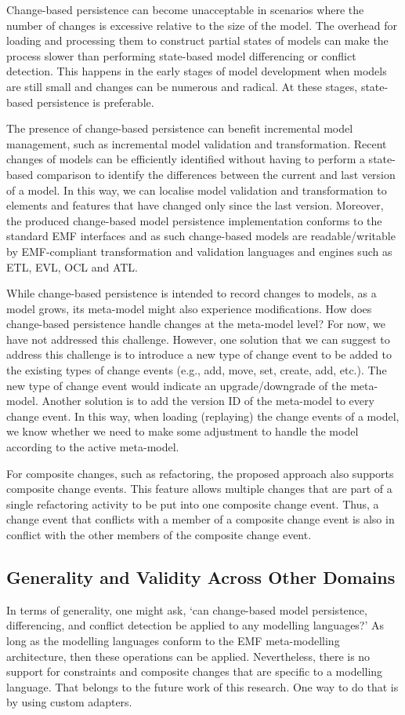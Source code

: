 Change-based persistence can become unacceptable in scenarios where the number of changes is excessive relative to the size of the model. The overhead for loading and processing them to construct partial states of models can make the process slower than performing state-based model differencing or conflict detection. This happens in the early stages of model development when models are still small and changes can be numerous and radical. At these stages, state-based persistence is preferable.

The presence of change-based persistence can benefit incremental model management, such as incremental model validation and transformation. Recent changes of models can be efficiently identified without having to perform a state-based comparison to identify the differences between the current and last version of a model. In this way, we can localise model validation and transformation to elements and features that have changed only since the last version. Moreover, the produced change-based model persistence implementation conforms to the standard EMF interfaces and as such change-based models are readable/writable by EMF-compliant transformation and validation languages and engines such as ETL, EVL, OCL and ATL.

While change-based persistence is intended to record changes to models, as a model grows, its meta-model might also experience modifications. How does change-based persistence handle changes at the meta-model level? For now, we have not addressed this challenge. However, one solution that we can suggest to address this challenge is to introduce a new type of change event to be added to the existing types of change events (e.g., add, move, set, create, add, etc.). The new type of change event would indicate an upgrade/downgrade of the meta-model. Another solution is to add the version ID of the meta-model to every change event. In this way, when loading (replaying) the change events of a model, we know whether we need to make some adjustment to handle the model according to the active meta-model.

For composite changes, such as refactoring, the proposed approach also supports composite change events. This feature allows multiple changes that are part of a single refactoring activity to be put into one composite change event. Thus, a change event that conflicts with a member of a composite change event is also in conflict with the other members of the composite change event.

\subsection{Generality and Validity Across Other Domains}
\label{sec:generality}
In terms of generality, one might ask, ‘can change-based model persistence, differencing, and conflict detection be applied to any modelling languages?’ As long as the modelling languages conform to the EMF meta-modelling architecture, then these operations can be applied. Nevertheless, there is no support for constraints and composite changes that are specific to a modelling language. That belongs to the future work of this research. One way to do that is by using custom adapters.

